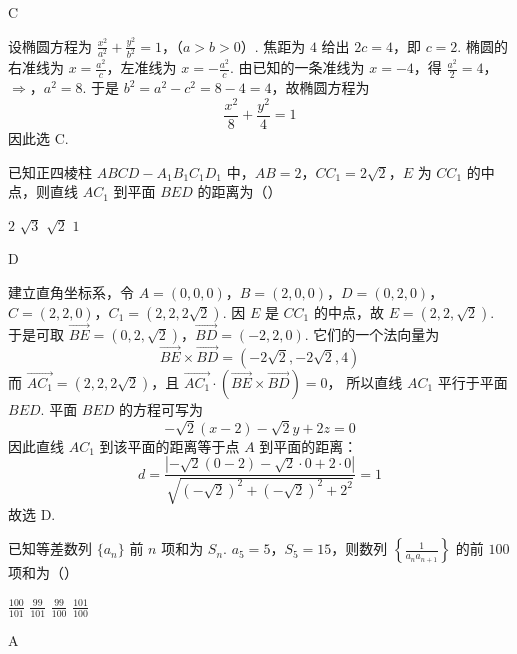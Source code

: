 \begin{answer}
C
\end{answer}

\begin{solution}
设椭圆方程为
\(\frac{x^2}{a^2}+\frac{y^2}{b^2}=1\)，（\(a>b>0\)）.
焦距为 \(4\) 给出 \(2c=4\)，即 \(c=2\). 椭圆的右准线为 \(x=\frac{a^2}{c}\)，左准线为 \(x=-\frac{a^2}{c}\). 由已知的一条准线为 \(x=-4\)，得
\(\frac{a^2}{2}=4\)，\(\Longrightarrow\)，\(a^2=8\).
于是 \(b^2=a^2-c^2=8-4=4\)，故椭圆方程为
\[
\frac{x^2}{8}+\frac{y^2}{4}=1
\]
因此选 C.
\end{solution}

\begin{problem}
已知正四棱柱 \(ABCD - A_{1}B_{1}C_{1}D_{1}\) 中，\(AB = 2\)，\(CC_{1} = 2\sqrt{2}\)，\(E\) 为 \(CC_{1}\) 的中点，则直线 \(AC_{1}\) 到平面 \(BED\) 的距离为（\quad）

\choices
    {\(2\)}
    {\(\sqrt{3}\)}
    {\(\sqrt{2}\)}
    {\(1\)}
\end{problem}

\begin{answer}
D
\end{answer}

\begin{solution}
建立直角坐标系，令 \(A=(0,0,0)\)，\(B=(2,0,0)\)，\(D=(0,2,0)\)，\(C=(2,2,0)\)，\(C_1=(2,2,2\sqrt2)\).
因 \(E\) 是 \(CC_1\) 的中点，故 \(E=(2,2,\sqrt2)\). 于是可取
\(\overrightarrow{BE}=(0,2,\sqrt2)\)，\(\overrightarrow{BD}=(-2,2,0)\).
它们的一个法向量为
\[
\overrightarrow{BE}\times\overrightarrow{BD}=(-2\sqrt2,-2\sqrt2,4)
\]
而 \(\overrightarrow{AC_1}=(2,2,2\sqrt2)\)，且
\(\overrightarrow{AC_1}\cdot(\overrightarrow{BE}\times\overrightarrow{BD})=0\)，
所以直线 \(AC_1\) 平行于平面 \(BED\). 平面 \(BED\) 的方程可写为
\[
-\sqrt2(x-2)-\sqrt2y+2z=0
\]
因此直线 \(AC_1\) 到该平面的距离等于点 \(A\) 到平面的距离：
\[
d=\frac{\left|-\sqrt2(0-2)-\sqrt2\cdot0+2\cdot0\right|}
{\sqrt{(-\sqrt2)^2+(-\sqrt2)^2+2^2}}=1
\]
故选 D.
\end{solution}

\begin{problem}
已知等差数列 \(\{a_{n}\}\) 前 \(n\) 项和为 \(S_{n}\). \(a_{5} = 5\)，\(S_{5} = 15\)，则数列 \(\left\{\frac{1}{a_n a_{n+1}}\right\}\) 的前 \(100\) 项和为（\quad）

\choices
    {\(\frac{100}{101}\)}
    {\(\frac{99}{101}\)}
    {\(\frac{99}{100}\)}
    {\(\frac{101}{100}\)}
\end{problem}

\begin{answer}
A
\end{answer}

